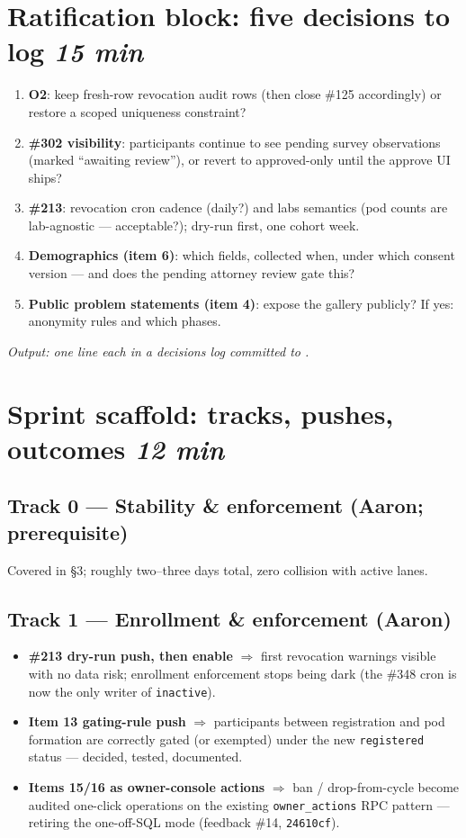 \documentclass[10pt]{article}
\newcommand{\gh}[1]{\mbox{\##1}}
\newcommand{\tbox}[1]{\hfill {\normalsize\normalfont\itshape #1}}
\newcommand{\push}[2]{\item \textbf{#1} $\Rightarrow$ #2}
\begin{document}
\section{Ratification block: five decisions to log \tbox{15 min}}
\begin{enumerate}
  \item \textbf{O2}: keep fresh-row revocation audit rows (then close \gh{125} accordingly) or restore a scoped uniqueness constraint?
  \item \textbf{\gh{302} visibility}: participants continue to see pending survey observations (marked ``awaiting review''), or revert to approved-only until the approve UI ships?
  \item \textbf{\gh{213}}: revocation cron cadence (daily?) and labs semantics (pod counts are lab-agnostic --- acceptable?); dry-run first, one cohort week.
  \item \textbf{Demographics (item 6)}: which fields, collected when, under which consent version --- and does the pending attorney review gate this?
  \item \textbf{Public problem statements (item 4)}: expose the gallery publicly? If yes: anonymity rules and which phases.
\end{enumerate}
\emph{Output: one line each in a decisions log committed to .}

\section{Sprint scaffold: tracks, pushes, outcomes \tbox{12 min}}

\subsection{Track 0 --- Stability \& enforcement (Aaron; prerequisite)}
Covered in \S3; roughly two--three days total, zero collision with active lanes.

\subsection{Track 1 --- Enrollment \& enforcement (Aaron)}
\begin{itemize}
  \push{\gh{213} dry-run push, then enable}{first revocation warnings visible with no data risk; enrollment enforcement stops being dark (the \gh{348} cron is now the only writer of \texttt{inactive}).}
  \push{Item 13 gating-rule push}{participants between registration and pod formation are correctly gated (or exempted) under the new \texttt{registered} status --- decided, tested, documented.}
  \push{Items 15/16 as owner-console actions}{ban / drop-from-cycle become audited one-click operations on the existing \texttt{owner\_actions} RPC pattern --- retiring the one-off-SQL mode (feedback \#14, \texttt{24610cf}).}
\end{itemize}
\end{document}
